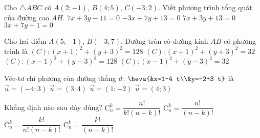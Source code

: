 \begin{ex}%
	Cho $\triangle ABC$ có $A(2;-1)$, $B(4;5)$, $C(-3;2)$. Viết phương trình tổng quát của đường cao $AH$.
	\choice
	{\True $7x + 3y -11 = 0$}
	{$-3x + 7y +13 = 0$}
	{$7x + 3y +13 = 0 $}
	{$3x + 7y + 1=0$}
\end{ex}

\begin{ex}%
	Cho hai điểm $A(5;-1)$, $B(-3;7)$. Đường tròn có đường kính $AB$ có phương trình là
	\choice
	{$(C)\colon (x+1)^2 + (y+3)^2 = 128$}
	{$(C)\colon (x+1)^2 + (y+3)^2 = 32$}
	{$(C)\colon (x-1)^2 + (y-3)^2 = 128$}
	{$(C)\colon (x-1)^2 + (y-3)^2 = 32$}
\end{ex}
\begin{ex}%
Véc-tơ chỉ phương của đường thẳng $d\colon \heva{&x=1-4 t\\&y=-2+3 t}$ là
	\choice
	{\True $\vec{u}=(-4 ; 3)$}
	{$\vec{u}=(3 ; 4)$}
	{$\vec{u}=(1 ;-2)$}
	{$\vec{u}=(4 ; 3)$}
\end{ex}
\begin{ex}%
	Khẳng định nào sau đây đúng?
	\choice
	{\True $\mathrm{C}_n^k=\dfrac{n !}{k !(n-k) !}$}
	{$\mathrm{C}_n^k=\dfrac{n !}{(n-k) !}$}
	{$\mathrm{C}_n^k=\dfrac{k !}{n !(n-k) !}$}
	{$\mathrm{C}_n^k=\dfrac{k !}{(n-k) !}$}
\end{ex}
